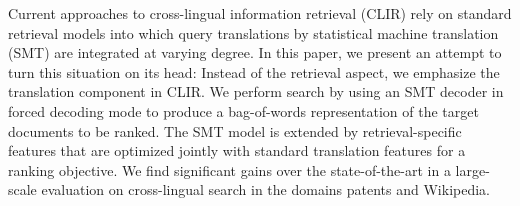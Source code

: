Current approaches to cross-lingual information retrieval (CLIR) rely on standard retrieval models into which query translations by statistical machine translation (SMT) are integrated at varying degree. In this paper, we present an attempt to turn this situation on its head: Instead of the retrieval aspect, we emphasize the translation component in CLIR. We perform search by using an SMT decoder in forced decoding mode to produce a bag-of-words representation of the target documents to be ranked. The SMT model is extended by retrieval-specific features that are optimized jointly with standard translation features for a ranking objective. We find significant gains over the state-of-the-art in a large-scale evaluation on cross-lingual search in the domains patents and Wikipedia.
